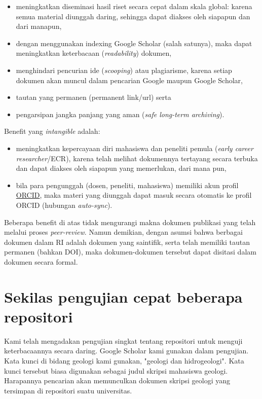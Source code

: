 \documentclass[a4paper]{article}
\begin{document}
\begin{itemize}
\item meningkatkan diseminasi hasil riset secara cepat dalam skala global: karena semua material diunggah daring, sehingga dapat diakses oleh siapapun dan dari manapun, 

\item dengan menggunakan indexing Google Scholar (salah satunya), maka dapat meningkatkan keterbacaan (\textit{readability}) dokumen,

\item menghindari pencurian ide (\textit{scooping}) atau plagiarisme, karena setiap dokumen akan muncul dalam pencarian Google maupun Google Scholar,

\item tautan yang permanen (permanent link/url) serta 

\item pengarsipan jangka panjang yang aman (\textit{safe long-term archiving}). 
\end{itemize}

Benefit yang \textit{intangible} adalah:

\begin{itemize}
\item meningkatkan kepercayaan diri mahasiswa dan peneliti pemula (\textit{early career researcher}/ECR), karena telah melihat dokumennya tertayang secara terbuka dan dapat diakses oleh siapapun yang memerlukan, dari mana pun,

\item bila para pengunggah (dosen, peneliti, mahasiswa) memiliki akun profil \href{orcid.org}{ORCID}, maka materi yang diunggah dapat masuk secara otomatis ke profil ORCID (hubungan \textit{auto-sync}).
\end{itemize}

Beberapa benefit di atas tidak mengurangi makna dokumen publikasi yang telah melalui proses \textit{peer-review}. Namun demikian, dengan asumsi bahwa berbagai dokumen dalam RI adalah dokumen yang saintifik, serta telah memiliki tautan permanen (bahkan DOI), maka dokumen-dokumen tersebut dapat disitasi dalam dokumen secara formal. 

\section{Sekilas pengujian cepat beberapa repositori} 

Kami telah mengadakan pengujian singkat tentang repositori untuk menguji keterbacaannya secara daring. Google Scholar kami gunakan dalam pengujian. Kata kunci di bidang geologi kami gunakan, "geologi dan hidrogeologi". Kata kunci tersebut biasa digunakan sebagai judul skripsi mahasiswa geologi. Harapannya pencarian akan memunculkan dokumen skripsi geologi yang tersimpan di repositori suatu universitas.
\end{document}

